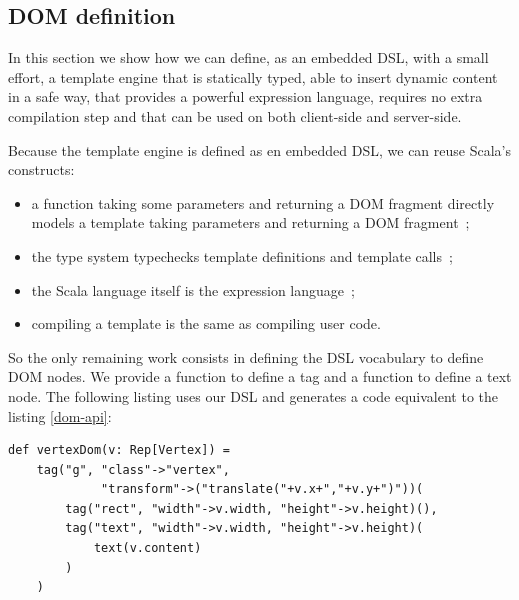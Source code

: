 \documentclass[american,english,runningheads]{llncs}
\begin{document}


\subsection{DOM definition}

In this section we show how we can define, as an embedded DSL, with a small effort, a template engine that is statically typed, able to insert dynamic content in a safe way, that provides a powerful expression language, requires no extra compilation step and that can be used on both client-side and server-side.

Because the template engine is defined as en embedded DSL, we can reuse Scala’s constructs:

\begin{itemize}
\item a function taking some parameters and returning a DOM fragment directly models a template taking parameters and returning a DOM fragment~;
\item the type system typechecks template definitions and template calls~;
\item the Scala language itself is the expression language~;
\item compiling a template is the same as compiling user code.
\end{itemize}

So the only remaining work consists in defining the DSL vocabulary to define DOM nodes. We provide a  function to define a tag and a  function to define a text node. The following listing uses our DSL and generates a code equivalent to the listing \ref{dom-api}:

\begin{lstlisting}[label=forest-hello,caption=DOM definition DSL]
def vertexDom(v: Rep[Vertex]) =
    tag("g", "class"->"vertex",
             "transform"->("translate("+v.x+","+v.y+")"))(
        tag("rect", "width"->v.width, "height"->v.height)(),
        tag("text", "width"->v.width, "height"->v.height)(
            text(v.content)
        )
    )
\end{lstlisting}
\end{document}
